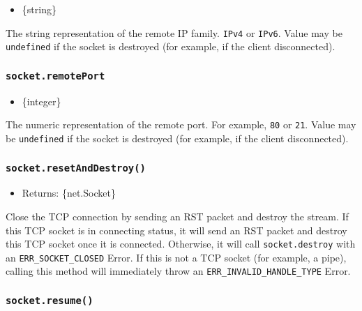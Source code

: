 \begin{itemize}
\tightlist
\item
  \{string\}
\end{itemize}

The string representation of the remote IP family.
\texttt{\textquotesingle{}IPv4\textquotesingle{}} or
\texttt{\textquotesingle{}IPv6\textquotesingle{}}. Value may be
\texttt{undefined} if the socket is destroyed (for example, if the
client disconnected).

\subsubsection{\texorpdfstring{\texttt{socket.remotePort}}{socket.remotePort}}\label{socket.remoteport}

\begin{itemize}
\tightlist
\item
  \{integer\}
\end{itemize}

The numeric representation of the remote port. For example, \texttt{80}
or \texttt{21}. Value may be \texttt{undefined} if the socket is
destroyed (for example, if the client disconnected).

\subsubsection{\texorpdfstring{\texttt{socket.resetAndDestroy()}}{socket.resetAndDestroy()}}\label{socket.resetanddestroy}

\begin{itemize}
\tightlist
\item
  Returns: \{net.Socket\}
\end{itemize}

Close the TCP connection by sending an RST packet and destroy the
stream. If this TCP socket is in connecting status, it will send an RST
packet and destroy this TCP socket once it is connected. Otherwise, it
will call \texttt{socket.destroy} with an \texttt{ERR\_SOCKET\_CLOSED}
Error. If this is not a TCP socket (for example, a pipe), calling this
method will immediately throw an \texttt{ERR\_INVALID\_HANDLE\_TYPE}
Error.

\subsubsection{\texorpdfstring{\texttt{socket.resume()}}{socket.resume()}}\label{socket.resume}

